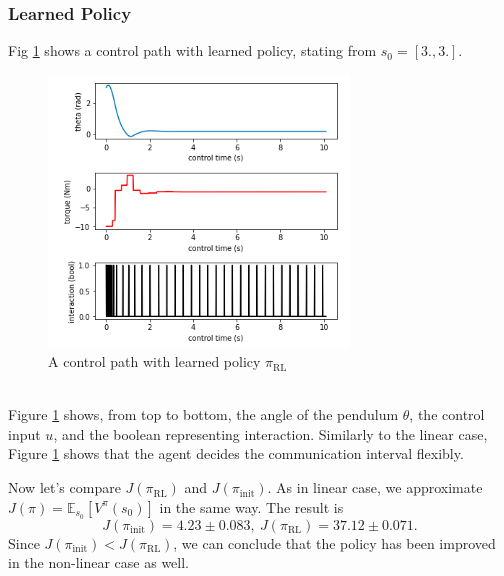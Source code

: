 \documentclass[english, dvipdfmx]{ampmt}             %
\newcommand{\expect}{\mathbb{E}}
\begin{document}
\subsubsection{Learned Policy}
Fig \ref{path_1} shows a control path with learned policy, stating from $s_0 = [3., 3.]$.
\begin{figure}[h]
	\centering
 	\includegraphics[width=8cm]{path_1.png}
 	\caption{A control path with learned policy $\pi_{\textrm{RL}}$} \label{path_1}
\end{figure}\\
Figure \ref{path_1} shows, from top to bottom, the angle of the pendulum $\theta$, the control input $u$, and the boolean representing interaction. Similarly to the linear case, Figure \ref{path_1} shows that the agent decides the communication interval flexibly.\par
Now let's compare $J(\pi_{\textrm{RL}})$ and $J(\pi_{\textrm{init}})$. As in linear case, we approximate $J(\pi) = \expect_{s_0}[V^{\pi}(s_0)]$ in the same way. The result is
\begin{equation}
	J(\pi_{\textrm{init}}) = 4.23 \pm 0.083,~J(\pi_{\textrm{RL}}) = 37.12 \pm 0.071 \label{compare_policy}.
\end{equation}
Since $J(\pi_{\textrm{init}}) < J(\pi_{\textrm{RL}})$, we can conclude that the policy has been improved in the non-linear case as well.
\end{document}
